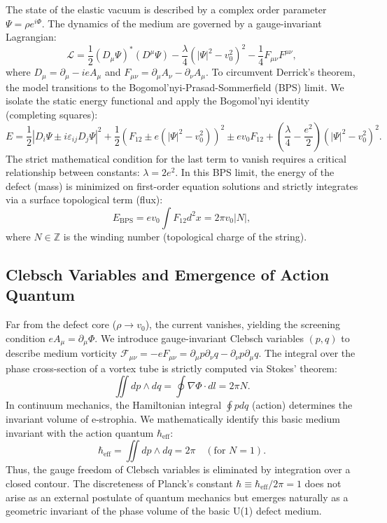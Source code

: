 \documentclass[12pt,a4paper]{article}
\begin{document}
The state of the elastic vacuum is described by a complex order parameter $\Psi = \rho e^{i\Phi}$. The dynamics of the medium are governed by a gauge-invariant Lagrangian:
\begin{equation}
    \mathcal{L} = \frac{1}{2}(D_\mu\Psi)^*(D^\mu\Psi) - \frac{\lambda}{4}(|\Psi|^2-v_0^2)^2 - \frac{1}{4}F_{\mu\nu}F^{\mu\nu},
    \label{eq:lagrangian}
\end{equation}
where $D_\mu = \partial_\mu - ieA_\mu$ and $F_{\mu\nu} = \partial_\mu A_\nu - \partial_\nu A_\mu$. To circumvent Derrick's theorem, the model transitions to the Bogomol'nyi-Prasad-Sommerfield (BPS) limit. We isolate the static energy functional and apply the Bogomol'nyi identity (completing squares):
\begin{equation}
    E = \frac{1}{2}|D_i\Psi \pm i\varepsilon_{ij}D_j\Psi|^2 + \frac{1}{2}\left(F_{12} \pm e(|\Psi|^2-v_0^2)\right)^2 \pm ev_0 F_{12} + \left(\frac{\lambda}{4}-\frac{e^2}{2}\right)(|\Psi|^2-v_0^2)^2.
    \label{eq:energy_identity}
\end{equation}
The strict mathematical condition for the last term to vanish requires a critical relationship between constants: $\lambda = 2e^2$. In this BPS limit, the energy of the defect (mass) is minimized on first-order equation solutions and strictly integrates via a surface topological term (flux):
\begin{equation}
    E_{\text{BPS}} = ev_0 \int F_{12} d^2x = 2\pi v_0 |N|,
    \label{eq:bps_energy}
\end{equation}
where $N \in \mathbb{Z}$ is the winding number (topological charge of the string).

\subsection{Clebsch Variables and Emergence of Action Quantum}
Far from the defect core ($\rho \to v_0$), the current vanishes, yielding the screening condition $eA_\mu = \partial_\mu \Phi$. We introduce gauge-invariant Clebsch variables $(p,q)$ to describe medium vorticity $\mathcal{F}_{\mu\nu} = -eF_{\mu\nu} = \partial_\mu p \partial_\nu q - \partial_\nu p \partial_\mu q$. The integral over the phase cross-section of a vortex tube is strictly computed via Stokes' theorem:
\begin{equation}
    \iint dp \wedge dq = \oint \nabla \Phi \cdot dl = 2\pi N.
    \label{eq:clebsch_integral}
\end{equation}
In continuum mechanics, the Hamiltonian integral $\oint pdq$ (action) determines the invariant volume of e-strophia. We mathematically identify this basic medium invariant with the action quantum $\hbar_{\text{eff}}$:
\begin{equation}
    \hbar_{\text{eff}} = \iint dp \wedge dq = 2\pi \quad (\text{for } N=1).
    \label{eq:action_quantum}
\end{equation}
Thus, the gauge freedom of Clebsch variables is eliminated by integration over a closed contour. The discreteness of Planck's constant $\hbar \equiv \hbar_{\text{eff}}/2\pi = 1$ does not arise as an external postulate of quantum mechanics but emerges naturally as a geometric invariant of the phase volume of the basic U(1) defect medium.
\end{document}
